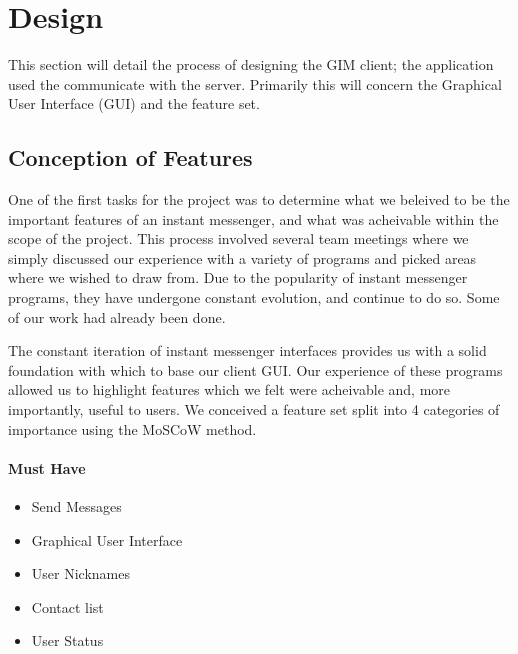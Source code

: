 \chapter{Design}
\label{design}





This section will detail the process of designing the GIM client; the application used the communicate with the server. Primarily this will concern the Graphical User Interface (GUI) and the feature set.

\section{Conception of Features}

One of the first tasks for the project was to determine what we beleived to be the important features of an instant messenger, and what was acheivable within the scope of the project. This process involved several team meetings where we simply discussed our experience with a variety of programs and picked areas where we wished to draw from. Due to the popularity of instant messenger programs, they have undergone constant evolution, and continue to do so. Some of our work had already been done.

\newline

The constant iteration of instant messenger interfaces provides us with a solid foundation with which to base our client GUI. Our experience of these programs allowed us to highlight features which we felt were acheivable and, more importantly, useful to users. We conceived a feature set split into 4 categories of importance using the MoSCoW method.

\subsubsection{Must Have}

\begin{itemize}

\item{Send Messages}
\item{Graphical User Interface}
\item{User Nicknames}
\item{Contact list}
\item{User Status}

\end{itemize}

